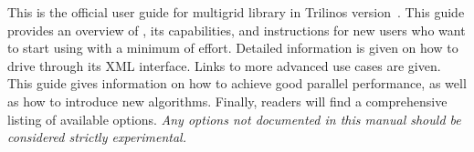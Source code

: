 
This is the official user guide for \muelu{} multigrid library in Trilinos
version~. This guide provides an overview of \muelu, its capabilities, and
instructions for new users who want to start using \muelu{} with a minimum of
effort. Detailed information is given on how to drive \muelu{} through its XML
interface. Links to more advanced use cases are given. This guide gives
information on how to achieve good parallel performance, as well as how to
introduce new algorithms. Finally, readers will find a comprehensive listing of
available \muelu{} options.  {\em Any options not documented in this manual
should be considered strictly experimental.}
